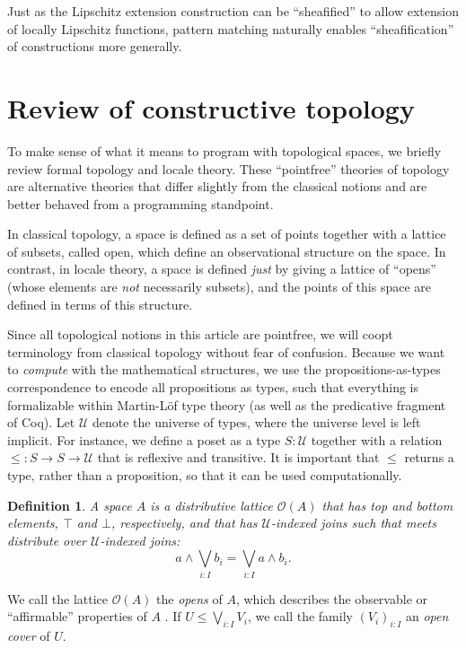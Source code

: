 \documentclass[conference]{IEEEtran}
\newtheorem{definition}{Definition}
\newcommand{\Type}{\mathcal{U}}
\newcommand{\Open}[1]{\mathcal{O}({#1})}
\begin{document}
Just as the Lipschitz extension construction can be ``sheafified'' to allow extension of locally Lipschitz functions, pattern matching naturally enables ``sheafification'' of constructions more generally.

\section{Review of constructive topology}
\label{s:topology}

To make sense of what it means to program with topological spaces, we briefly review formal topology and locale theory. These ``pointfree'' theories of topology are alternative theories that differ slightly from the classical notions and are better behaved from a programming standpoint.

In classical topology, a space is defined as a set of points together with a lattice of subsets, called open, which define an observational structure on the space. In contrast, in locale theory, a space is defined \emph{just} by giving a lattice of ``opens'' (whose elements are \emph{not} necessarily subsets), and the points of this space are defined in terms of this structure.

Since all topological notions in this article are pointfree, we will coopt terminology from classical topology without fear of confusion. Because we want to \emph{compute} with the mathematical structures, we use the propositions-as-types correspondence \cite{toolbox} to encode all propositions as types, such that everything is formalizable within Martin-L\"of type theory (as well as the predicative fragment of Coq). Let $\Type$ denote the universe of types, where the universe level is left implicit. For instance, we define a poset as a type $S : \Type$ together with a relation $\le : S \to S \to \Type$ that is reflexive and transitive. It is important that $\le$ returns a type, rather than a proposition, so that it can be used computationally.

\begin{definition}
A \emph{space} $A$ is a distributive lattice $\Open{A}$ that has top and bottom elements, $\top$ and $\bot$, respectively, and that has $\Type$-indexed joins such that meets distribute over $\Type$-indexed joins: 
\[
a \wedge \bigvee_{i : I} b_i = \bigvee_{i : I} a \wedge b_i.
\]
\end{definition}

We call the lattice $\Open{A}$ the \emph{opens} of $A$, which describes the observable or ``affirmable'' properties of $A$ \cite{topologyvialogic}. If $U \le \bigvee_{i : I} V_i$, we call the family $(V_i)_{i : I}$ an \emph{open cover} of $U$.
\end{document}

